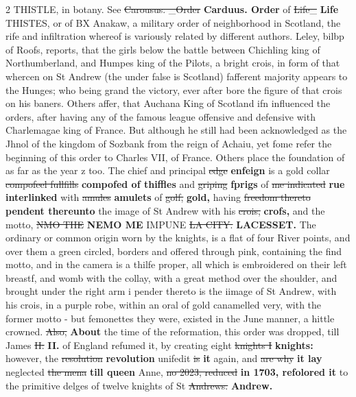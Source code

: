 \documentclass[10pt]{article}
\begin{document}
\begin{multicols}{2}
THISTLE, in botany. See \sout{Carousus. \_Order} \textbf{Carduus. Order} of \sout{Life\_} \textbf{Life} THISTES, or of BX Anakaw, a military order of neighborhood in Scotland, the rife and infiltration whereof is variously related by different authors. Leley, bilbp of Roofs, reports, that the girls below the battle between Chichling king of Northumberland, and Humpes king of the Pilots, a bright crois, in form of that whercen on St Andrew (the under false is Scotland) fafferent majority appears to the Hunges; who being grand the victory, ever after bore the figure of that crois on his baners. Others affer, that Auchana King of Scotland ifn influenced the orders, after having any of the famous league offensive and defensive with Charlemagae king of France. But although he still had been acknowledged as the Jhnol of the kingdom of Sozbank from the reign of Achaiu, yet fome refer the beginning of this order to Charles VII, of France. Others place the foundation of as far as the year z too. The chief and principal \sout{edge} \textbf{enfeign} is a gold collar \sout{compofeel fullfills} \textbf{compofed of thiffles} and \sout{griping} \textbf{fprigs} of \sout{me indicated} \textbf{rue interlinked} with \sout{amules} \textbf{amulets} of \sout{golf,} \textbf{gold,} having \sout{freedom thereto} \textbf{pendent thereunto} the image of St Andrew with his \sout{crois,} \textbf{crofs,} and the motto, \sout{NMO THE} \textbf{NEMO ME} IMPUNE \sout{LA CITY.} \textbf{LACESSET.} The ordinary or common origin worn by the knights, is a flat of four River points, and over them a green circled, borders and offered through pink, containing the find motto, and in the camera is a thilfe proper, all which is embroidered on their left breastf, and womb with the collay, with a great method over the shoulder, and brought under the right arm i pender thereto is the iimage of St Andrew, with his crois, in a purple robe, within an oral of gold canamelled very, with the former motto - but femonettes they were, existed in the June manner, a hittle crowned. \sout{Also,} \textbf{About} the time of the reformation, this order was dropped, till James \sout{II:} \textbf{II.} of England refumed it, by creating eight \sout{knights I} \textbf{knights:} however, the \sout{resolution} \textbf{revolution} unifedit \sout{is} \textbf{it} again, and \sout{are why} \textbf{it lay} neglected \sout{the mena} \textbf{till queen} Anne, \sout{no 2023, reduced} \textbf{in 1703, refolored it} to the primitive delges of twelve knights of St \sout{Andrews.} \textbf{Andrew.}


\end{multicols}
\end{document}
